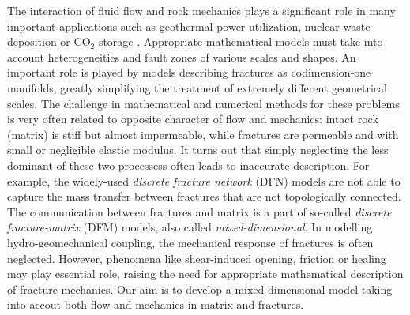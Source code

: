 \documentclass[a4paper]{article}
\numberwithin{equation}{section}
\begin{document}


The interaction of fluid flow and rock mechanics plays a significant role in many important applications such as geothermal power utilization, nuclear waste deposition or CO${}_2$ storage \cite{rutqvist2003role}.
Appropriate mathematical models must take into account heterogeneities and fault zones of various scales and shapes.
An important role is played by models describing fractures as codimension-one manifolds, greatly simplifying the treatment of extremely different geometrical scales.
The challenge in mathematical and numerical methods for these problems is very often related to opposite character of flow and mechanics: intact rock (matrix) is stiff but almost impermeable, while fractures are permeable and with small or negligible elastic modulus.
It turns out that simply neglecting the less dominant of these two processess often leads to inaccurate description.
For example, the widely-used \textit{discrete fracture network} (DFN) models are not able to capture the mass transfer between fractures that are not topologically connected.
The communication between fractures and matrix is a part of so-called \textit{discrete fracture-matrix} (DFM) models, also called \textit{mixed-dimensional}.
In modelling hydro-geomechanical coupling, the mechanical response of fractures is often neglected.
However, phenomena like shear-induced opening, friction or healing may play essential role, raising the need for appropriate mathematical description of fracture mechanics.
Our aim is to develop a mixed-dimensional model taking into accout both flow and mechanics in matrix and fractures.
\end{document}

